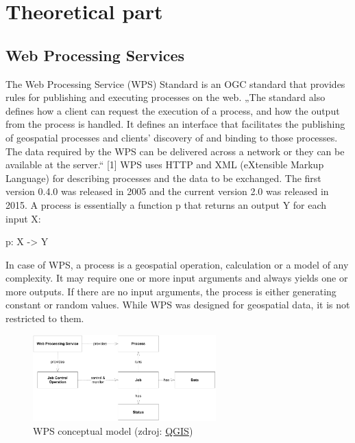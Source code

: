\chapter{Theoretical part}
\label{2-teorie}




\section{Web Processing Services}

The Web Processing Service (WPS) Standard is an OGC standard that provides rules for publishing and executing processes on the web. „The standard also defines how a client can request the execution of a process, and how the output from the process is handled. It defines an interface that facilitates the publishing of geospatial processes and clients’ discovery of and binding to those processes. The data required by the WPS can be delivered across a network or they can be available at the server.“ [1] WPS uses HTTP and XML (eXtensible Markup Language) for describing processes and the data to be exchanged. The first version 0.4.0 was released in 2005 and the current version 2.0 was released in 2015.
A process is essentially a function p that returns an output Y for each input X:\\
\centerline{p: X -> Y}
In case of WPS, a process is a geospatial operation, calculation or a model of any complexity. It may require one or more input arguments and always yields one or more outputs. If there are no input arguments, the process is either generating constant or random values. While WPS was designed for geospatial data, it is not restricted to them.



\begin{figure}[H] \centering
      \includegraphics[width=200pt]{./pictures/wps_conceptual_model.png}
      \caption[QGIS logo]{WPS conceptual model (zdroj:
\href{https://www.qgis.org/en/_downloads/qgis-logo.png}{QGIS})}
      \label{fig:qgis}
  \end{figure}




